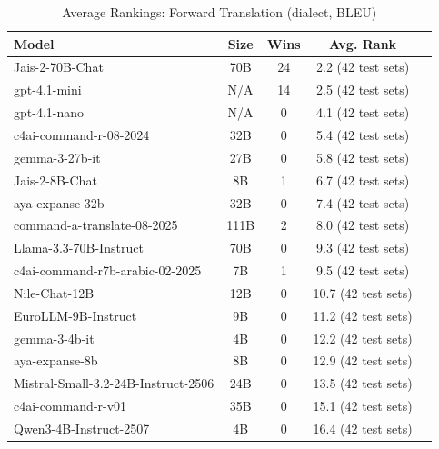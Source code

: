 \begin{table}[htbp]
\centering
\caption{Average Rankings: Forward Translation (dialect, BLEU)}
\label{tab:avg_rankings_bleu_dialect}
\begin{tabular}{l@{\hspace{3pt}}c@{\hspace{3pt}}c@{\hspace{3pt}}c@{\hspace{3pt}}c}
\toprule
Model & Size & Wins & Avg. Rank \\
\midrule
Jais-2-70B-Chat & 70B & 24 & 2.2 (42 test sets) \\
gpt-4.1-mini & N/A & 14 & 2.5 (42 test sets) \\
gpt-4.1-nano & N/A & 0 & 4.1 (42 test sets) \\
c4ai-command-r-08-2024 & 32B & 0 & 5.4 (42 test sets) \\
gemma-3-27b-it & 27B & 0 & 5.8 (42 test sets) \\
Jais-2-8B-Chat & 8B & 1 & 6.7 (42 test sets) \\
aya-expanse-32b & 32B & 0 & 7.4 (42 test sets) \\
command-a-translate-08-2025 & 111B & 2 & 8.0 (42 test sets) \\
Llama-3.3-70B-Instruct & 70B & 0 & 9.3 (42 test sets) \\
c4ai-command-r7b-arabic-02-2025 & 7B & 1 & 9.5 (42 test sets) \\
Nile-Chat-12B & 12B & 0 & 10.7 (42 test sets) \\
EuroLLM-9B-Instruct & 9B & 0 & 11.2 (42 test sets) \\
gemma-3-4b-it & 4B & 0 & 12.2 (42 test sets) \\
aya-expanse-8b & 8B & 0 & 12.9 (42 test sets) \\
Mistral-Small-3.2-24B-Instruct-2506 & 24B & 0 & 13.5 (42 test sets) \\
c4ai-command-r-v01 & 35B & 0 & 15.1 (42 test sets) \\
Qwen3-4B-Instruct-2507 & 4B & 0 & 16.4 (42 test sets) \\
\bottomrule
\end{tabular}
\end{table}